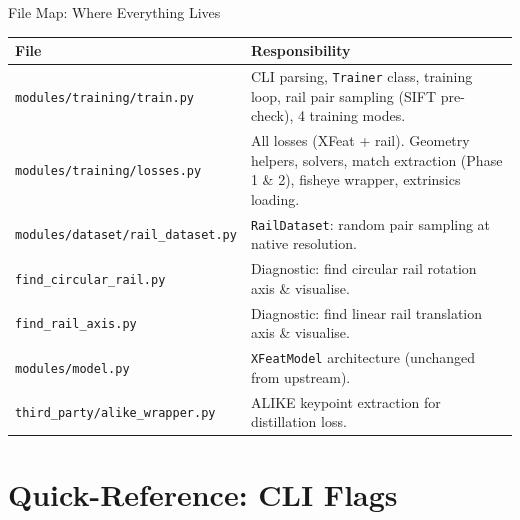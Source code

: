 \documentclass[aspectratio=169, 12pt]{beamer}
\begin{document}
\begin{frame}{File Map: Where Everything Lives}
\small
\begin{center}
\begin{tabular}{lp{8cm}}
\toprule
\textbf{File} & \textbf{Responsibility} \\
\midrule
\texttt{modules/training/train.py} &
  CLI parsing, \texttt{Trainer} class, training loop,
  rail pair sampling (SIFT pre-check), 4 training modes. \\
\texttt{modules/training/losses.py} &
  All losses (XFeat + rail). Geometry helpers, solvers,
  match extraction (Phase 1 \& 2), fisheye wrapper, extrinsics loading. \\
\texttt{modules/dataset/rail\_dataset.py} &
  \texttt{RailDataset}: random pair sampling at native resolution. \\
\texttt{find\_circular\_rail.py} &
  Diagnostic: find circular rail rotation axis \& visualise. \\
\texttt{find\_rail\_axis.py} &
  Diagnostic: find linear rail translation axis \& visualise. \\
\texttt{modules/model.py} &
  \texttt{XFeatModel} architecture (unchanged from upstream). \\
\texttt{third\_party/alike\_wrapper.py} &
  ALIKE keypoint extraction for distillation loss. \\
\bottomrule
\end{tabular}
\end{center}
\end{frame}


\section{Quick-Reference: CLI Flags}
\end{document}
